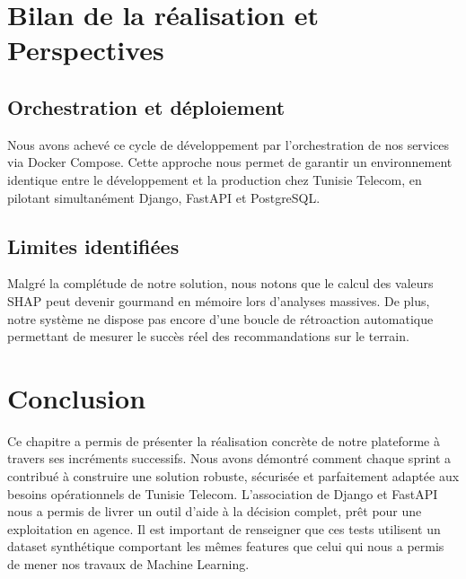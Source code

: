 \section{Bilan de la réalisation et Perspectives}

\subsection{Orchestration et déploiement}

Nous avons achevé ce cycle de développement par l'orchestration de nos services via Docker Compose. Cette approche nous permet de garantir un environnement identique entre le développement et la production chez Tunisie Telecom, en pilotant simultanément Django, FastAPI et PostgreSQL.

\subsection{Limites identifiées}

Malgré la complétude de notre solution, nous notons que le calcul des valeurs SHAP peut devenir gourmand en mémoire lors d'analyses massives. De plus, notre système ne dispose pas encore d'une boucle de rétroaction automatique permettant de mesurer le succès réel des recommandations sur le terrain.

\section{Conclusion}

Ce chapitre a permis de présenter la réalisation concrète de notre plateforme à travers ses incréments successifs. Nous avons démontré comment chaque sprint a contribué à construire une solution robuste, sécurisée et parfaitement adaptée aux besoins opérationnels de Tunisie Telecom. L'association de Django et FastAPI nous a permis de livrer un outil d'aide à la décision complet, prêt pour une exploitation en agence. Il est important de renseigner que ces tests utilisent un dataset synthétique comportant les mêmes features que celui qui nous a permis de mener nos travaux de Machine Learning.
